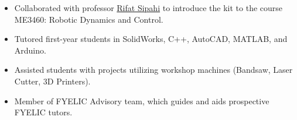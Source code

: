 \documentclass[10pt,a4paper,ragged2e,withhyper]{altacv}
\begin{document}
\begin{paracol}{2}
\begin{itemize}
        \item Collaborated with professor \href{https://coe.northeastern.edu/people/sipahi-rifat/}{Rifat Sipahi} to introduce the kit to the course ME3460: Robotic Dynamics and Control.
    \end{itemize}
    \begin{itemize}
        \item Tutored first-year students in SolidWorks, C++, AutoCAD, MATLAB, and Arduino.
        \item Assisted students with projects utilizing workshop machines (Bandsaw, Laser Cutter, 3D Printers).
        \item Member of FYELIC Advisory team, which guides and aids prospective FYELIC tutors.
    \end{itemize}



\end{paracol}
\end{document}
